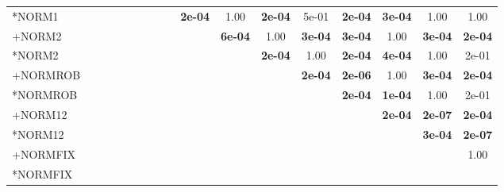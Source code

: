 \begin{table}[t]
{\begin{tabular}{lcccccccccccccccc}
*NORM1 &  &  &  &  &  &  &  &  & \textbf{2e-04} & 1.00 & \textbf{2e-04} & 5e-01 & \textbf{2e-04} & \textbf{3e-04} & 1.00 & 1.00 \\
+NORM2 &  &  &  &  &  &  &  &  &  & \textbf{6e-04} & 1.00 & \textbf{3e-04} & \textbf{3e-04} & 1.00 & \textbf{3e-04} & \textbf{2e-04} \\
*NORM2 &  &  &  &  &  &  &  &  &  &  & \textbf{2e-04} & 1.00 & \textbf{2e-04} & \textbf{4e-04} & 1.00 & 2e-01 \\
+NORMROB &  &  &  &  &  &  &  &  &  &  &  & \textbf{2e-04} & \textbf{2e-06} & 1.00 & \textbf{3e-04} & \textbf{2e-04} \\
*NORMROB &  &  &  &  &  &  &  &  &  &  &  &  & \textbf{2e-04} & \textbf{1e-04} & 1.00 & 2e-01 \\
+NORM12 &  &  &  &  &  &  &  &  &  &  &  &  &  & \textbf{2e-04} & \textbf{2e-07} & \textbf{2e-04} \\
*NORM12 &  &  &  &  &  &  &  &  &  &  &  &  &  &  & \textbf{3e-04} & \textbf{2e-07} \\
+NORMFIX &  &  &  &  &  &  &  &  &  &  &  &  &  &  &  & 1.00 \\
*NORMFIX &  &  &  &  &  &  &  &  &  &  &  &  &  &  &  &  \\
\bottomrule
\end{tabular}
}
\end{table}

